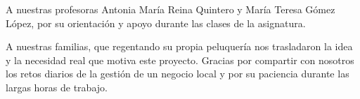 
A nuestras profesoras Antonia Mar\'ia Reina Quintero y María Teresa Gómez López, por su orientación y apoyo durante las clases de la asignatura.

A nuestras familias, que regentando su propia peluquer\'ia nos trasladaron la idea y la necesidad real que motiva este proyecto. Gracias por compartir con nosotros los retos diarios de la gesti\'on de un negocio local y por su paciencia durante las largas horas de trabajo.

